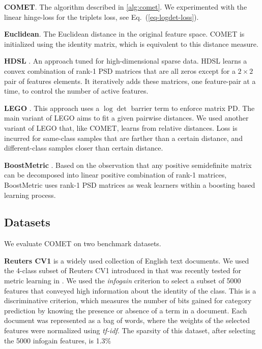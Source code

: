 \documentclass{article} %
\renewcommand{\eqref}[1]{Eq.~(\ref{#1})}
\begin{document}
\textbf{COMET}. The algorithm described in \ref{alg:comet}. We experimented with the linear hinge-loss for the triplets loss, see \eqref{eq-logdet-loss}.

\textbf{Euclidean}. The Euclidean distance in the original feature space. COMET is initialized using the identity matrix, which is equivalent to this distance measure.

\textbf{HDSL} \cite{hdsl}. An approach tuned for high-dimensional sparse data. HDSL learns a convex combination of rank-1 PSD matrices that are all zeros except for a $2\times2$ pair of features elements. It iteratively adds these matrices, one feature-pair at a time, to control the number of active features.

\textbf{LEGO} \cite{lego}. This approach uses a $\log \det$ barrier term to enforce matrix PD. The main variant of LEGO aims to fit a given pairwise distances. We used another variant of LEGO that, like COMET, learns from relative distances. Loss is incurred for same-class samples that are farther than a certain distance, and different-class samples closer than certain distance.

\textbf{BoostMetric} \cite{boost}. Based on the observation that any positive semidefinite matrix can be decomposed into linear positive combination of rank-1 matrices, BoostMetric uses rank-1 PSD matrices as weak learners within a boosting based learning process.


\subsection{Datasets}
We evaluate COMET on two benchmark datasets.

\textbf{Reuters CV1} is a widely used collection of English text documents. We used the 4-class subset of Reuters CV1 introduced in \cite{CaiRCV14} that was recently tested for metric learning in \cite{hdsl}. We used the \textit{infogain} criterion \cite{infogain} to select a subset of 5000 features that conveyed high information about the identity of the class. This is a discriminative criterion, which measures the number of bits gained for category prediction by knowing the presence or absence of a term in a document. Each document was represented as a bag of words, where the weights of the selected features were normalized using \textit{tf-idf}. The sparsity of this dataset, after selecting the 5000 infogain features, is 1.3\%
\end{document}
